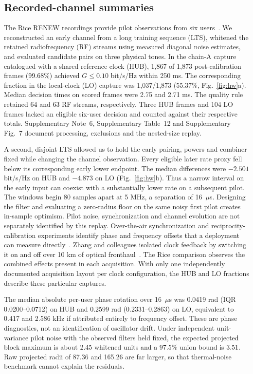 \documentclass[lineno,pdflatex,sn-nature]{sn-jnl}
\begin{document}
\subsection*{Recorded-channel summaries}
The Rice RENEW recordings provide pilot observations from six users~\cite{zafari,renew}. We reconstructed an early channel from a long training sequence (LTS), whitened the retained radiofrequency (RF) streams using measured diagonal noise estimates, and evaluated candidate pairs on three physical tones. In the chain-A capture catalogued with a shared reference clock (HUB), 1,867 of 1,873 post-calibration frames (99.68\%) achieved \(G\leq0.10\) bit/s/Hz within 250 ms. The corresponding fraction in the local-clock (LO) capture was 1,037/1,873 (55.37\%, Fig.~\ref{fig:hw}a). Median decision times on scored frames were 2.75 and 2.71 ms. The quality rule retained 64 and 63 RF streams, respectively. Three HUB frames and 104 LO frames lacked an eligible six-user decision and counted against their respective totals. Supplementary Note~6, Supplementary Table~12 and Supplementary Fig.~7 document processing, exclusions and the nested-size replay.

A second, disjoint LTS allowed us to hold the early pairing, powers and combiner fixed while changing the channel observation. Every eligible later rate proxy fell below its corresponding early lower endpoint. The median differences were \(-2.501\) bit/s/Hz on HUB and \(-4.873\) on LO (Fig.~\ref{fig:hw}b). Thus a narrow interval on the early input can coexist with a substantially lower rate on a subsequent pilot. The windows begin 80 samples apart at 5 MHz, a separation of 16~\(\mu\)s. Designing the filter and evaluating a zero-radius floor on the same noisy first pilot creates in-sample optimism. Pilot noise, synchronization and channel evolution are not separately identified by this replay. Over-the-air synchronization and reciprocity-calibration experiments identify phase and frequency offsets that a deployment can measure directly~\cite{rogalin,vieira,ganesan}. Zhang and colleagues isolated clock feedback by switching it on and off over 10 km of optical fronthaul~\cite{zhangsync2026}. The Rice comparison observes the combined effects present in each acquisition. With only one independently documented acquisition layout per clock configuration, the HUB and LO fractions describe these particular captures.

The median absolute per-user phase rotation over 16~\(\mu\)s was 0.0419 rad (IQR 0.0200--0.0712) on HUB and 0.2599 rad (0.2331--0.2863) on LO, equivalent to 0.417 and 2.586 kHz if attributed entirely to frequency offset. These are phase diagnostics, not an identification of oscillator drift. Under independent unit-variance pilot noise with the observed filters held fixed, the expected projected block maximum is about 2.45 whitened units and a 97.5\% union bound is 3.51. Raw projected radii of 87.36 and 165.26 are far larger, so that thermal-noise benchmark cannot explain the residuals.
\end{document}
